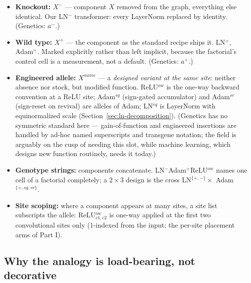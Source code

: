 \documentclass[11pt]{article}
\begin{document}
\begin{itemize}
\item \textbf{Knockout:} $X^{-}$ --- component $X$ removed from the
graph, everything else identical. Our LN$^{-}$ transformer: every
LayerNorm replaced by identity. (Genetics: $a^{-}$.)
\item \textbf{Wild type:} $X^{+}$ --- the component as the standard
recipe ships it. LN$^{+}$, Adam$^{+}$. Marked explicitly rather than
left implicit, because the factorial's control cell is a measurement,
not a default. (Genetics: $a^{+}$.)
\item \textbf{Engineered allele:} $X^{\mathit{name}}$ --- a
\emph{designed variant at the same site}: neither absence nor stock,
but modified function. ReLU$^{\mathit{ow}}$ is the one-way backward
convention at a ReLU site; Adam$^{\mathit{sg}}$ (sign-gated
accumulator) and Adam$^{\mathit{sr}}$ (sign-reset on revival) are
alleles of Adam; LN$^{\mathit{eq}}$ is LayerNorm with
equinormalized scale (Section~\ref{sec:ln-decomposition}).
(Genetics has no symmetric standard here --- gain-of-function and
engineered insertions are handled by ad-hoc named superscripts and
transgene notation; the field is arguably on the cusp of needing
this slot, while machine learning, which designs new function
routinely, needs it today.)
\item \textbf{Genotype strings:} components concatenate.
LN$^{-}$Adam$^{+}$ReLU$^{\mathit{ow}}$ names one cell of a factorial
completely; a $2\times3$ design is the cross
LN$^{\{+,-\}} \times$ Adam$^{\{+,\mathit{sg},\mathit{sr}\}}$.
\item \textbf{Site scoping:} where a component appears at many
sites, a site list subscripts the allele:
ReLU$^{\mathit{ow}}_{c1,c2}$ is one-way applied at the first two
convolutional sites only (1-indexed from the input; the per-site
placement arms of Part I).
\end{itemize}

\subsection{Why the analogy is load-bearing, not decorative}
\end{document}
